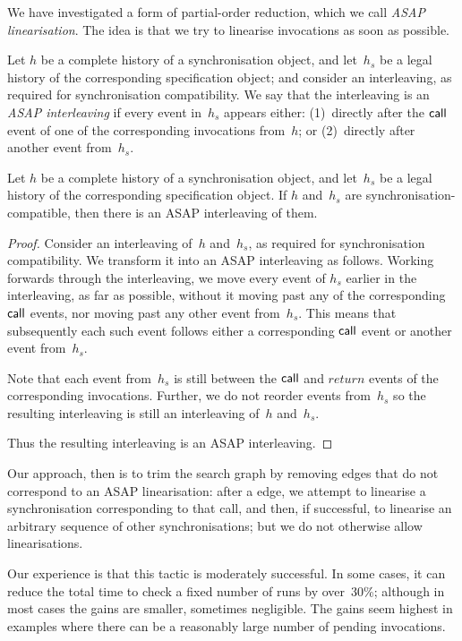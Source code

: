We have investigated a form of partial-order reduction, which we call
\emph{ASAP linearisation}.  The idea is that we try to linearise invocations
as soon as possible.
%
\begin{definition}
Let $h$ be a complete history of a synchronisation object, and let~$h_s$ be a
legal history of the corresponding specification object; and consider an
interleaving, as required for synchronisation compatibility.  We say that the
interleaving is an \emph{ASAP interleaving} if every event in~$h_s$ appears
either: (1)~directly after the $\mathsf{call}$ event of one of the corresponding
invocations from~$h$; or (2)~directly after another event from~$h_s$.
\end{definition}
%
\begin{lemma}
Let $h$ be a complete history of a synchronisation object, and let~$h_s$ be a
legal history of the corresponding specification object.  If $h$ and~$h_s$ are
synchronisation-compatible, then there is an ASAP interleaving of them.
\end{lemma}
%
\begin{proof}
Consider an interleaving of~$h$ and~$h_s$, as required for synchronisation
compatibility.  We transform it into an ASAP interleaving as follows.  Working
forwards through the interleaving, we move every event of $h_s$ earlier in the
interleaving, as far as possible, without it moving past any of the corresponding
$\mathsf{call}$ events, nor moving past any other event from~$h_s$.  This means that
subsequently each such event follows either a corresponding $\mathsf{call}$ event or
another event from~$h_s$.

Note that each event from~$h_s$ is still between the $\mathsf{call}$ and $return$
events of the corresponding invocations.  Further, we do not reorder events
from~$h_s$ so the resulting interleaving is still an interleaving of~$h$
and~$h_s$.

Thus the resulting interleaving is an ASAP interleaving.
\end{proof}
%
Our approach, then is to trim the search graph by removing
 edges that do not correspond to an ASAP
linearisation: after a  edge, we attempt to linearise a
synchronisation corresponding to that call, and then, if successful, to
linearise an arbitrary sequence of other synchronisations; but we do not
otherwise allow linearisations.

Our experience is that this tactic is moderately successful.  In some cases,
it can reduce the total time to check a fixed number of runs by over~30\%;
although in most cases the gains are smaller, sometimes negligible.  The gains
seem highest in examples where there can be a reasonably large number of
pending invocations.
 
